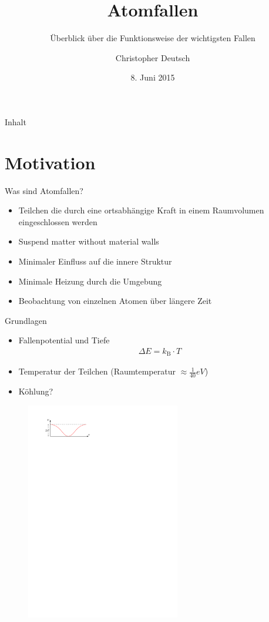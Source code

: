 \documentclass[12pt]{beamer}
\author[Christopher Deutsch]
{Christopher Deutsch}
\title
{Atomfallen}
\subtitle
{Überblick über die Funktionsweise der wichtigsten Fallen}
\institute[]
{Rheinische Friedrich-Wilhelms-Universität Bonn \\
Proseminar Präsentationstechnik SS15}
\date{8. Juni 2015}
\begin{document}
\maketitle

\begin{frame}{Inhalt}
	\tableofcontents
\end{frame}


\section{Motivation}

\begin{frame}{Was sind Atomfallen?}
	\begin{itemize}
		\item Teilchen die durch eine ortsabhängige Kraft in einem Raumvolumen eingeschlossen werden
		\item Suspend matter without material walls
		\item Minimaler Einfluss auf die innere Struktur
		\item Minimale Heizung durch die Umgebung
		\item Beobachtung von einzelnen Atomen über längere Zeit
	\end{itemize}
\end{frame}

\begin{frame}{Grundlagen}
	\begin{itemize}
		\item Fallenpotential und Tiefe
		\begin{align}
		\Delta E = k_\mathrm{B} \cdot T
		\end{align}
		\item Temperatur der Teilchen (Raumtemperatur $\approx \frac{1}{40} \si{eV}$)
		\item Köhlung?
		
	\end{itemize}
	\begin{figure}
		\centering
		\includegraphics[width=0.6\textwidth]{./figures/fallentiefe.pdf}
	\end{figure}
\end{frame}
\end{document}

